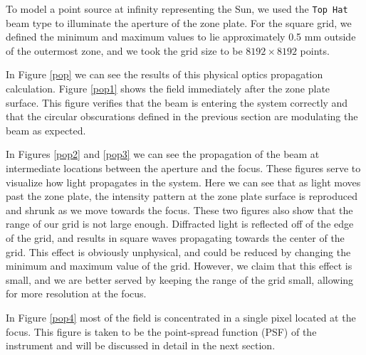 \documentclass[10pt,letterpaper]{article}
\begin{document}
				To model a point source at infinity representing the Sun, we used the \texttt{Top Hat} beam type to illuminate the aperture of the zone plate. For the square grid, we defined the minimum and maximum values to lie approximately 0.5 mm outside of the outermost zone, and we took the grid size to be $8192\times8192$ points.
				
				In Figure \ref{pop} we can see the results of this physical optics propagation calculation. Figure \ref{pop1} shows the field immediately after the zone plate surface. This figure verifies that the beam is entering the system correctly and that the circular obscurations defined in the previous section are modulating the beam as expected. 
				
				In Figures \ref{pop2} and \ref{pop3} we can see the propagation of the beam at intermediate locations between the aperture and the focus. These figures serve to visualize how light propagates in the system. Here we can see that as light moves past the zone plate, the intensity pattern at the zone plate surface is reproduced and shrunk as we move towards the focus. These two figures also show that the range of our grid is not large enough. Diffracted light is reflected off of the edge of the grid, and results in square waves propagating towards the center of the grid. This effect is obviously unphysical, and could be reduced by changing the minimum and maximum value of the grid. However, we claim that this effect is small, and we are better served by keeping the range of the grid small, allowing for more resolution at the focus.
				
				In Figure \ref{pop4} most of the field is concentrated in a single pixel located at the focus. This figure is taken to be the point-spread function (PSF) of the instrument and will be discussed in detail in the next section.
			
\end{document}
